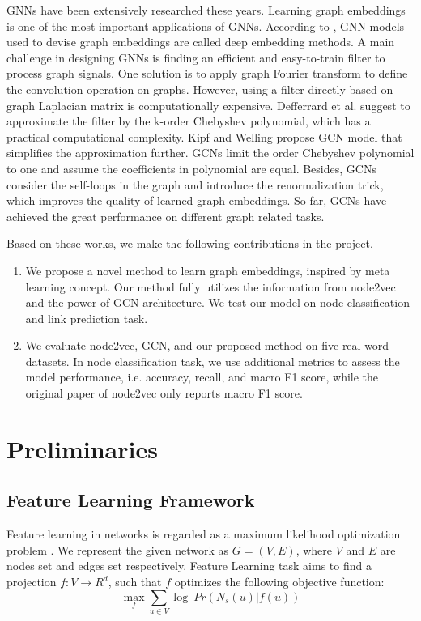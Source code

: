 \documentclass[sigconf]{acmart}
\begin{document}
GNNs have been extensively researched these years. Learning graph embeddings is one of the most important applications of GNNs. According to \cite{murphy2022}, GNN models used to devise graph embeddings are called deep embedding methods. A main challenge in designing GNNs is finding an efficient and easy-to-train filter to process graph signals. One solution is to apply graph Fourier transform to define the convolution operation on graphs. However, using a filter directly based on graph Laplacian matrix is computationally expensive. Defferrard et al. \cite{Defferrard2016} suggest to approximate the filter by the k-order Chebyshev polynomial, which has a practical computational complexity. Kipf and Welling \cite{gcn} propose GCN model that simplifies the approximation further. GCNs limit the order Chebyshev polynomial to one and assume the coefficients in polynomial are equal. Besides, GCNs consider the self-loops in the graph and introduce the renormalization trick, which improves the quality of learned graph embeddings. So far, GCNs have achieved the great performance on different graph related tasks.\par

Based on these works, we make the following contributions in the project.
\begin{enumerate}
    \item We propose a novel method to learn graph embeddings, inspired by meta learning concept. Our method fully utilizes the information from node2vec and the power of GCN architecture. We test our model on node classification and link prediction task.
    \item We evaluate node2vec, GCN, and our proposed method on five real-word datasets. In node classification task, we use additional metrics to assess the model performance, i.e. accuracy, recall, and macro F1 score, while the original paper of node2vec only reports macro F1 score.
\end{enumerate}

\section{Preliminaries}
\subsection{Feature Learning Framework}
Feature learning in networks is regarded as a maximum likelihood optimization problem \cite{node2vec}. We represent the given network as $G=(V,E)$, where $V$ and $E$ are nodes set and edges set respectively. Feature Learning task aims to find a projection $f: V \rightarrow R^d$, such that $f$ optimizes the following objective function:
$$\mathop{max}\limits_{f} \sum_{u\in V}\log\ Pr(N_s(u)|f(u))$$
\end{document}
